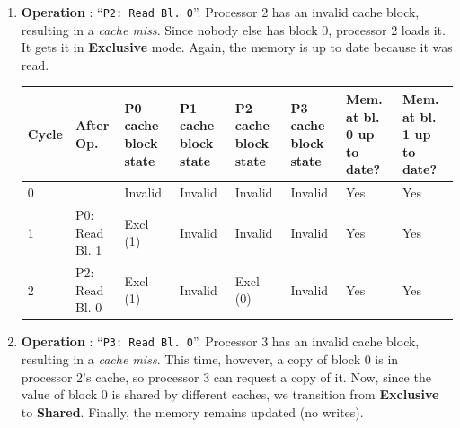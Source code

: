\begin{enumerate}
    \item \textbf{Operation \theenumi}: ``\texttt{P2: Read Bl. 0}''. Processor 2 has an invalid cache block, resulting in a \emph{cache miss}. Since nobody else has block 0, processor 2 loads it. It gets it in \textbf{Exclusive} mode. Again, the memory is up to date because it was read.

    \begin{table}[!htp]
        \centering
        \begin{adjustbox}{width={\textwidth},totalheight={\textheight},keepaspectratio}
            \begin{tabular}{@{} l l p{4em} p{4em} p{4em} p{4em} p{3em} p{3em} @{}}
                \toprule
                \textbf{Cycle} & \textbf{After Op.} & \textbf{P0 cache block state} & \textbf{P1 cache block state} & \textbf{P2 cache block state} & \textbf{P3 cache block state} & \textbf{Mem. at bl. 0 up to date?} & \textbf{Mem. at bl. 1 up to date?} \\
                \midrule
                0   &                   & Invalid   & Invalid   & Invalid   & Invalid   & Yes   & Yes   \\ [.3em]
                1   & P0: Read Bl. 1    & Excl (1)  & Invalid   & Invalid   & Invalid   & Yes   & Yes   \\ [.3em]
                2   & P2: Read Bl. 0    & Excl (1)  & Invalid   & Excl (0)  & Invalid   & Yes   & Yes   \\
                \bottomrule
            \end{tabular}
        \end{adjustbox}
    \end{table}


    \newpage


    \item \textbf{Operation \theenumi}: ``\texttt{P3: Read Bl. 0}''. Processor 3 has an invalid cache block, resulting in a \emph{cache miss}. This time, however, a copy of block 0 is in processor 2's cache, so processor 3 can request a copy of it. Now, since the value of block 0 is shared by different caches, we transition from \textbf{Exclusive} to \textbf{Shared}. Finally, the memory remains updated (no writes).


\end{enumerate}

